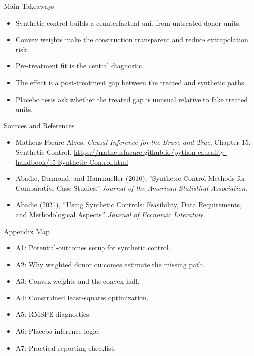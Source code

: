 \documentclass[11pt,aspectratio=169]{beamer}
\begin{document}
\begin{frame}{Main Takeaways}
  \begin{itemize}
    \item Synthetic control builds a counterfactual unit from untreated donor units.
    \item Convex weights make the construction transparent and reduce extrapolation risk.
    \item Pre-treatment fit is the central diagnostic.
    \item The effect is a post-treatment gap between the treated and synthetic paths.
    \item Placebo tests ask whether the treated gap is unusual relative to fake treated units.
  \end{itemize}
\end{frame}

\begin{frame}{Sources and References}
  \begin{itemize}
    \item Matheus Facure Alves, \emph{Causal Inference for the Brave and True}, Chapter 15: Synthetic Control. \url{https://matheusfacure.github.io/python-causality-handbook/15-Synthetic-Control.html}
    \item Abadie, Diamond, and Hainmueller (2010), ``Synthetic Control Methods for Comparative Case Studies.'' \emph{Journal of the American Statistical Association}.
    \item Abadie (2021), ``Using Synthetic Controls: Feasibility, Data Requirements, and Methodological Aspects.'' \emph{Journal of Economic Literature}.
  \end{itemize}
\end{frame}

\appendix

\begin{frame}{Appendix Map}
  \begin{itemize}
    \item A1: Potential-outcomes setup for synthetic control.
    \item A2: Why weighted donor outcomes estimate the missing path.
    \item A3: Convex weights and the convex hull.
    \item A4: Constrained least-squares optimization.
    \item A5: RMSPE diagnostics.
    \item A6: Placebo inference logic.
    \item A7: Practical reporting checklist.
  \end{itemize}
\end{frame}
\end{document}
